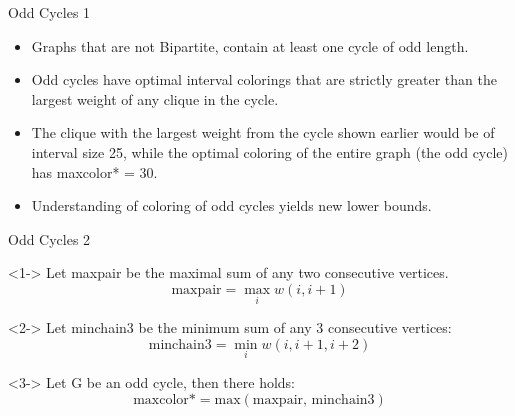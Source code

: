 \begin{frame}{Odd Cycles 1}
  \begin{itemize}
    \item<1-> Graphs that are not Bipartite, contain at least one cycle of odd length.
    \null
    \item<2-> Odd cycles have optimal interval colorings that are strictly greater than the largest weight of
    any clique in the cycle.
    \null
    \item<3-> The clique with the largest weight from the cycle shown earlier would be of interval size 25, while the
    optimal coloring of the entire graph (the odd cycle) has maxcolor* = 30.
    \null
    \item<4-> Understanding of coloring of odd cycles yields new lower bounds.
  \end{itemize}
\end{frame}

\begin{frame}{Odd Cycles 2}
  
  \begin{definition}<1->
    Let maxpair be the maximal sum of any two consecutive vertices. \footnotemark
    \[ \text{maxpair} = \max_i w(i, i + 1) \]
  \end{definition}

  \begin{definition}<2->
    Let minchain3 be the minimum sum of any 3 consecutive vertices:
    \[ \text{minchain3} = \min_i w(i, i + 1, i+2) \]
  \end{definition}

  \begin{theorem}<3->
    Let G be an odd cycle, then there holds:
    \[ \text{maxcolor*} = \text{max}(\text{maxpair, minchain3}) \]
  \end{theorem}

\end{frame}

